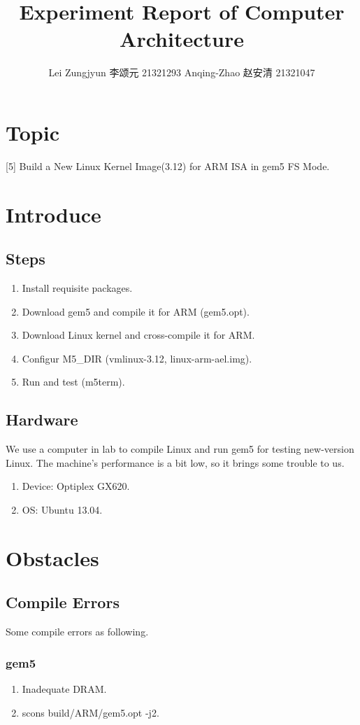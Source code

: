\documentclass[utf8,a4paper]{ctexart}
\title{Experiment Report of Computer Architecture}
\author{Lei Zungjyun 李颂元 21321293 Anqing-Zhao 赵安清 21321047}
\begin{document}
\maketitle

\section{Topic}
[5] Build a New Linux Kernel Image(3.12) for ARM ISA in gem5 FS Mode.

\section{Introduce}
	\subsection{Steps}
		\begin{enumerate}
			\item
			Install requisite packages.
			\item
			Download gem5 and compile it for ARM (gem5.opt).
			\item
			Download Linux kernel and cross-compile it for ARM.
			\item
			Configur M5\_DIR (vmlinux-3.12, linux-arm-ael.img).
			\item
			Run and test (m5term).
		\end{enumerate}
		
	\subsection{Hardware}
	We use a computer in lab to compile Linux and run gem5 for testing new-version Linux. The machine's performance is a bit low, so it brings some trouble to us.
		\begin{enumerate}
			\item
			Device: Optiplex GX620.
			\item
			OS: Ubuntu 13.04.
		\end{enumerate}

\section{Obstacles}
	\subsection{Compile Errors}
	Some compile errors as following.
		\subsubsection{gem5}
			\begin{enumerate}
				\item
				Inadequate DRAM.
				\item
				scons build/ARM/gem5.opt -j2.
			\end{enumerate}
\end{document}
